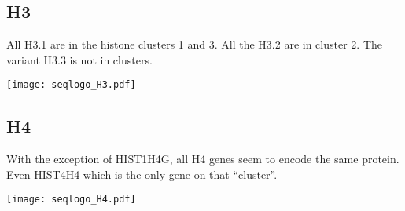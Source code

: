   \subsection{H3}

    All H3.1 are in the histone clusters 1 and 3. All the H3.2 are in cluster 2.
    The variant H3.3 is not in clusters.


    \begin{TableAndFigure*}
      \label{tab:H3-consensus}
      

      \texttt{[image: seqlogo\_H3.pdf]}
      \label{fig:H3-weblogo}
    \end{TableAndFigure*}

  \subsection{H4}
    With the exception of HIST1H4G, all H4 genes seem to encode the same protein. Even HIST4H4 which is the
    only gene on that ``cluster''.
    \begin{TableAndFigure*}
      \label{tab:H4-consensus}
      

      \texttt{[image: seqlogo\_H4.pdf]}
      \label{fig:H4-weblogo}
    \end{TableAndFigure*}

